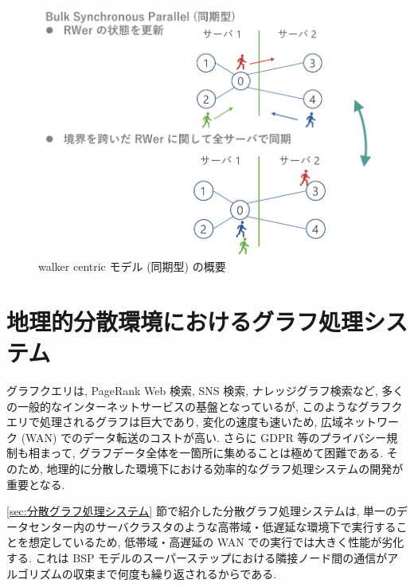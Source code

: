 \begin{figure}[t]
    \centering
    \includegraphics[scale=0.7]{figure/walkercentric.pdf}
    \caption{walker centric モデル (同期型) の概要}
    \label{walker centric モデル (同期型) の概要}
\end{figure}

\section{地理的分散環境におけるグラフ処理システム}

グラフクエリは, PageRank Web 検索\cite{334}, SNS 検索\cite{10.5555/2535461.2535468}, ナレッジグラフ検索\cite{10.1145/3331184.3331252}など, 多くの一般的なインターネットサービスの基盤となっているが, このようなグラフクエリで処理されるグラフは巨大であり, 変化の速度も速い\cite{10.1145/2723372.2735365}ため, 広域ネットワーク (WAN) でのデータ転送のコストが高い. さらに GDPR 等のプライバシー規制も相まって, グラフデータ全体を一箇所に集めることは極めて困難である. そのため, 地理的に分散した環境下における効率的なグラフ処理システムの開発が重要となる. 

\ref{sec:分散グラフ処理システム} 節で紹介した分散グラフ処理システムは, 単一のデータセンター内のサーバクラスタのような高帯域・低遅延な環境下で実行することを想定しているため, 低帯域・高遅延の WAN での実行では大きく性能が劣化する. これは BSP モデルのスーパーステップにおける隣接ノード間の通信がアルゴリズムの収束まで何度も繰り返されるからである. 

